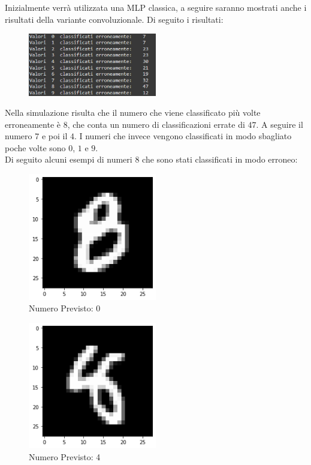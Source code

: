 \documentclass[12pt, a4paper]{article}
\begin{document}
Inizialmente verrà utilizzata una MLP classica, a seguire saranno mostrati anche i risultati della variante convoluzionale.
Di seguito i risultati:
\begin{figure}[H]
    \centering
    \includegraphics[width=0.50\textwidth]{ErrateClassica.png}
\end{figure}

Nella simulazione risulta che il numero che viene classificato più volte erroneamente è \(8\), che conta un numero di classificazioni errate di \(47\). A seguire il numero \(7\) e poi il \(4\). I numeri che invece vengono classificati in modo sbagliato poche volte sono \(0\), \(1\) e \(9\).\\
Di seguito alcuni esempi di numeri \(8\) che sono stati classificati in modo erroneo:
\begin{figure}[H]
    \centering
    \caption{Numero Previsto: 0}
    \includegraphics[width=0.50\textwidth]{otto1.png}
\end{figure} 
\begin{figure}[H]
    \centering
    \caption{Numero Previsto: 4}
    \includegraphics[width=0.50\textwidth]{otto2.png}
\end{figure} 
\end{document}

